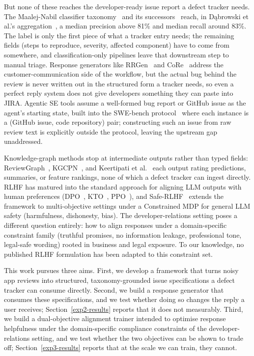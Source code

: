 \documentclass[preprint,12pt]{elsarticle}
\begin{document}
But none of these reaches the developer-ready issue report a defect tracker needs. The
  Maalej-Nabil classifier taxonomy~\cite{maalej2015bug} and its successors~\cite{chen2014ar,
  villarroel2016release, di2017surf, kaur2023bert, shah2020mining} reach, in D{\k a}browski et
  al.'s aggregation~\cite{dkabrowski2022analysing}, a median precision above 81\% and median
  recall around 83\%. The label is only the
  first piece of what a tracker entry needs; the remaining fields (steps to reproduce, severity,
   affected component) have to come from somewhere, and classification-only pipelines leave that
   downstream step to manual triage. Response generators like RRGen~\cite{gao2019automating} and
  CoRe~\cite{gao2021automating} address the customer-communication side of the workflow, but the
  actual bug behind the review is never written out in the structured form a tracker needs, so
  even a perfect reply system does not give developers something they can paste into JIRA.
  Agentic SE tools assume a well-formed bug report or GitHub issue as the agent's starting
  state, built into the SWE-bench protocol~\cite{jimenez2023swe} where each instance is a
  (GitHub issue, code repository) pair; constructing such an issue from raw review text is
  explicitly outside the protocol, leaving the upstream gap unaddressed.

Knowledge-graph methods stop at intermediate outputs rather than typed fields:
  ReviewGraph~\cite{de2025reviewgraph}, KGCPN~\cite{yu2024knowledge}, and Keertipati et
  al.~\cite{keertipati2016approaches} each output rating predictions, summaries, or feature rankings, none
   of which a defect tracker can ingest directly. RLHF has matured into the standard approach
  for aligning LLM outputs with human preferences (DPO~\cite{rafailov2023direct},
  KTO~\cite{ethayarajh2024kto}, PPO~\cite{schulman2017proximal}), and Safe-RLHF~\cite{dai2024safe} extends
  the framework to multi-objective settings under a Constrained MDP for general LLM safety
  (harmfulness, dishonesty, bias). The developer-relations setting poses a different question
  entirely: how to align responses under a domain-specific constraint family (truthful promises,
   no information leakage, professional tone, legal-safe wording) rooted in business and legal
  exposure. To our knowledge, no published RLHF formulation has been adapted to this constraint
  set.

This work pursues three aims. First, we develop a framework that turns noisy app reviews into structured, taxonomy-grounded issue specifications a defect tracker can consume directly. Second, we build a response generator that consumes these specifications, and we test whether doing so changes the reply a user receives; Section~\ref{exp2-results} reports that it does not measurably. Third, we build a dual-objective alignment trainer intended to optimise response helpfulness under the domain-specific compliance constraints of the developer-relations setting, and we test whether the two objectives can be shown to trade off; Section~\ref{exp3-results} reports that at the scale we can train, they cannot.
\end{document}
